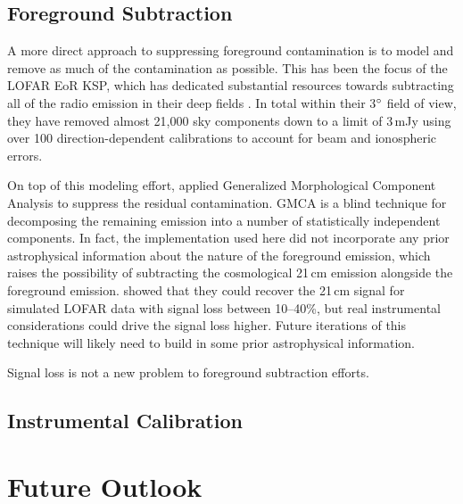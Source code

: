 \begin{bibunit}
\subsection{Foreground Subtraction}

A more direct approach to suppressing foreground contamination is to model and remove as much of the
contamination as possible. This has been the focus of the LOFAR EoR KSP, which has dedicated
substantial resources towards subtracting all of the radio emission in their deep fields
\citep{2017ApJ...838...65P}. In total within their 3$\mbox{$^\circ$}$ field of view, they have removed
almost 21,000 sky components down to a limit of 3\,mJy using over 100 direction-dependent
calibrations to account for beam and ionospheric errors.

On top of this modeling effort, \citet{2017ApJ...838...65P} applied Generalized Morphological
Component Analysis \citep[GMCA;][]{2013MNRAS.429..165C} to suppress the residual contamination.
GMCA is a blind technique for decomposing the remaining emission into a number of statistically
independent components. In fact, the implementation used here did not incorporate any prior
astrophysical information about the nature of the foreground emission, which raises the possibility
of subtracting the cosmological 21\,cm emission alongside the foreground emission.
\citet{2013MNRAS.429..165C} showed that they could recover the 21\,cm signal for simulated LOFAR
data with signal loss between 10--40\%, but real instrumental considerations could drive the signal
loss higher. Future iterations of this technique will likely need to build in some prior
astrophysical information.

Signal loss is not a new problem to foreground subtraction efforts.
\citep{2016MNRAS.463.4317P}


\subsection{Instrumental Calibration}



\section{Future Outlook}


\end{bibunit}

